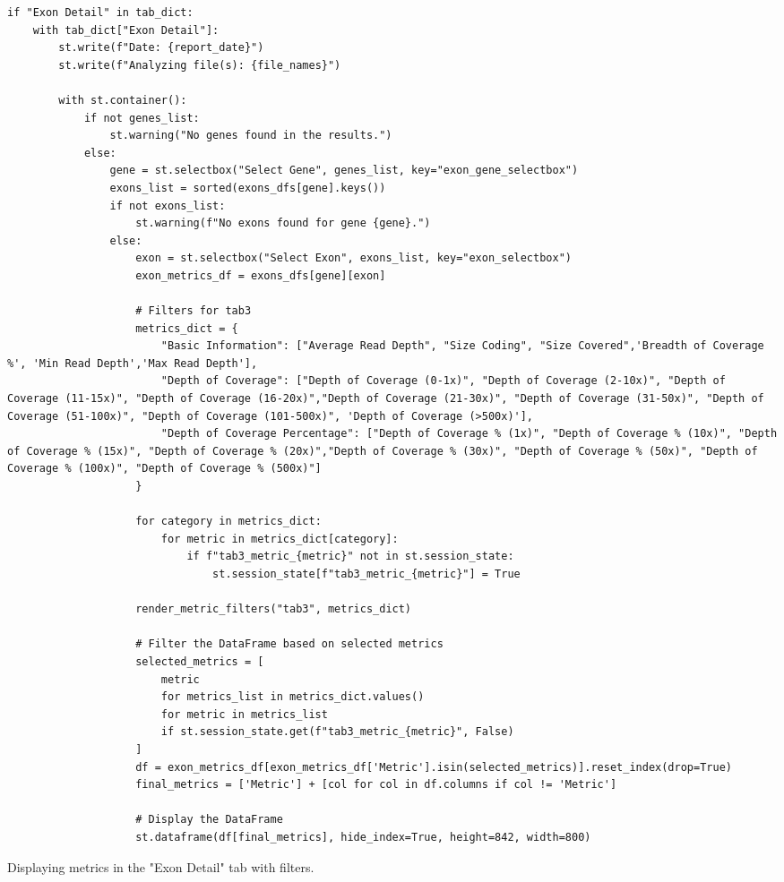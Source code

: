 \begin{longlisting}
\begin{verbatim}
if "Exon Detail" in tab_dict:
    with tab_dict["Exon Detail"]:
        st.write(f"Date: {report_date}")
        st.write(f"Analyzing file(s): {file_names}")
        
        with st.container():
            if not genes_list:
                st.warning("No genes found in the results.")
            else:
                gene = st.selectbox("Select Gene", genes_list, key="exon_gene_selectbox")
                exons_list = sorted(exons_dfs[gene].keys())
                if not exons_list:
                    st.warning(f"No exons found for gene {gene}.")
                else:
                    exon = st.selectbox("Select Exon", exons_list, key="exon_selectbox")
                    exon_metrics_df = exons_dfs[gene][exon]

                    # Filters for tab3
                    metrics_dict = {
                        "Basic Information": ["Average Read Depth", "Size Coding", "Size Covered",'Breadth of Coverage %', 'Min Read Depth','Max Read Depth'],
                        "Depth of Coverage": ["Depth of Coverage (0-1x)", "Depth of Coverage (2-10x)", "Depth of Coverage (11-15x)", "Depth of Coverage (16-20x)","Depth of Coverage (21-30x)", "Depth of Coverage (31-50x)", "Depth of Coverage (51-100x)", "Depth of Coverage (101-500x)", 'Depth of Coverage (>500x)'],
                        "Depth of Coverage Percentage": ["Depth of Coverage % (1x)", "Depth of Coverage % (10x)", "Depth of Coverage % (15x)", "Depth of Coverage % (20x)","Depth of Coverage % (30x)", "Depth of Coverage % (50x)", "Depth of Coverage % (100x)", "Depth of Coverage % (500x)"]
                    }

                    for category in metrics_dict:
                        for metric in metrics_dict[category]:
                            if f"tab3_metric_{metric}" not in st.session_state:
                                st.session_state[f"tab3_metric_{metric}"] = True

                    render_metric_filters("tab3", metrics_dict)

                    # Filter the DataFrame based on selected metrics
                    selected_metrics = [
                        metric
                        for metrics_list in metrics_dict.values()
                        for metric in metrics_list
                        if st.session_state.get(f"tab3_metric_{metric}", False)
                    ]
                    df = exon_metrics_df[exon_metrics_df['Metric'].isin(selected_metrics)].reset_index(drop=True)
                    final_metrics = ['Metric'] + [col for col in df.columns if col != 'Metric']

                    # Display the DataFrame
                    st.dataframe(df[final_metrics], hide_index=True, height=842, width=800)
\end{verbatim}
\caption{Displaying metrics in the "Exon Detail" tab with filters.}
\label{code:results-exon-detail-tab}
\end{longlisting}

